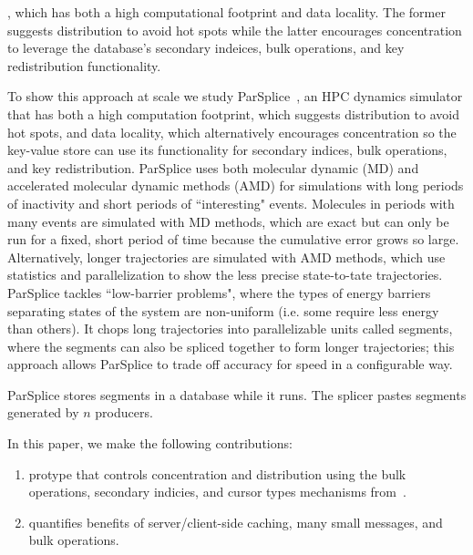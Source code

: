 , which has both a high computational footprint and data locality.
The former suggests distribution to avoid hot spots while the latter encourages
concentration to leverage the database's secondary indeices, bulk operations,
and key redistribution functionality. 

To show this approach at scale we study
ParSplice~\cite{perez:jctc20150parsplice}, an HPC dynamics simulator that has
both a high computation footprint, which suggests distribution to avoid hot
spots, and data locality, which alternatively encourages concentration so the
key-value store can use its functionality for secondary indices, bulk
operations, and key redistribution. ParSplice uses both molecular dynamic (MD)
and accelerated molecular dynamic methods (AMD) for simulations with long
periods of inactivity and short periods of ``interesting" events.  Molecules in
periods with many events are simulated with MD methods, which are exact but can
only be run for a fixed, short period of time because the cumulative error
grows so large. Alternatively, longer trajectories are simulated with AMD
methods, which use statistics and parallelization to show the less precise
state-to-tate trajectories. ParSplice tackles ``low-barrier problems", where
the types of energy barriers separating states of the system are non-uniform
(i.e. some require less energy than others). It chops long trajectories into
parallelizable units called segments, where the segments can also be spliced
together to form longer trajectories; this approach allows ParSplice to trade
off accuracy for speed in a configurable way.

ParSplice stores segments in a database while it runs. The splicer pastes
segments generated by \(n\) producers.

In this paper, we make the following contributions:

\begin{enumerate}

  \item protype that controls concentration and distribution using the bulk
  operations, secondary indicies, and cursor types mechanisms
  from~\cite{greenberg:hotstorage2015-mdhim}. 

  \item quantifies benefits of server/client-side caching, many small messages,
  and bulk operations.

\end{enumerate}
